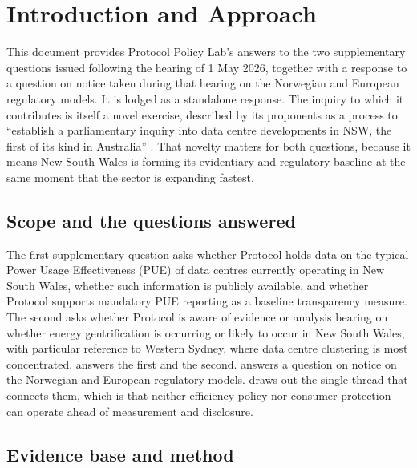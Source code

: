 \chapter{Introduction and Approach}
\label{ch:supp:intro}


This document provides Protocol Policy Lab's answers to the two supplementary questions issued following the hearing of 1 May 2026, together with a response to a question on notice taken during that hearing on the Norwegian and European regulatory models. It is lodged as a standalone response. The inquiry to which it contributes is itself a novel exercise, described by its proponents as a process to \enquote{establish a parliamentary inquiry into data centre developments in NSW, the first of its kind in Australia} \autocite{greensNSWDataCentreInquiry2026}. That novelty matters for both questions, because it means New South Wales is forming its evidentiary and regulatory baseline at the same moment that the sector is expanding fastest.

\section{Scope and the questions answered}
\label{sec:supp:scope}

The first supplementary question asks whether Protocol holds data on the typical Power Usage Effectiveness (PUE) of data centres currently operating in New South Wales, whether such information is publicly available, and whether Protocol supports mandatory PUE reporting as a baseline transparency measure. The second asks whether Protocol is aware of evidence or analysis bearing on whether energy gentrification is occurring or likely to occur in New South Wales, with particular reference to Western Sydney, where data centre clustering is most concentrated.  answers the first and  the second.  answers a question on notice on the Norwegian and European regulatory models.  draws out the single thread that connects them, which is that neither efficiency policy nor consumer protection can operate ahead of measurement and disclosure.

\section{Evidence base and method}
\label{sec:supp:method}

